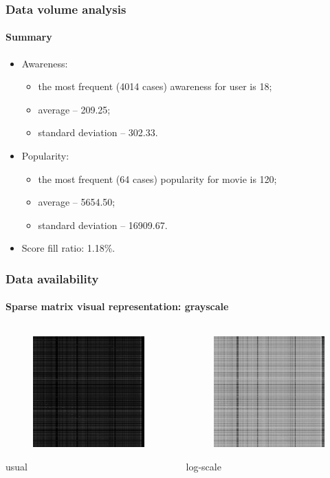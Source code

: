 \documentclass{beamer}
\begin{document}
\begin{frame}
\frametitle{Data volume analysis}
\framesubtitle{Summary}
\begin{itemize}
  \item Awareness:
  	\begin{itemize}
    \item the most frequent (4014 cases) awareness for user is 18;
    \item average -- 209.25;
    \item standard deviation -- 302.33. 
    \end{itemize}
  \item Popularity:
  	\begin{itemize}
    \item the most frequent (64 cases) popularity for movie is 120;
    \item average -- 5654.50; 
    \item standard deviation -- 16909.67. 
    \end{itemize}
  \item Score fill ratio: 1.18\%.
\end{itemize}
\end{frame}

\begin{frame}
\frametitle{Data availability}
\framesubtitle{Sparse matrix visual representation: grayscale}
\begin{columns}[T] %
\begin{column}{.48\textwidth}
\begin{figure}[h] 
    \includegraphics[width=5cm]{usual_grayscale_0.png}
\end{figure}
usual
\end{column}%
\hfill%
\begin{column}{.48\textwidth}
\begin{figure}[h] 
    \includegraphics[width=5cm]{log_grayscale_0.png}
\end{figure}
log-scale
\end{column}%
\end{columns}
\end{frame}
\end{document}
